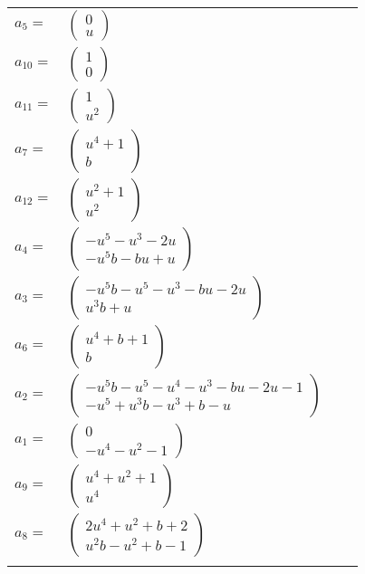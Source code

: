 \documentclass[1p]{elsarticle_modified}
\theoremstyle{definition}
\begin{document}
\begin{tabular}{m{7pt} m{180pt} m{7pt} m{180pt} }
\flushright $a_{5}=$&$\begin{pmatrix}0\\u\end{pmatrix}$ \\
\flushright $a_{10}=$&$\begin{pmatrix}1\\0\end{pmatrix}$ \\
\flushright $a_{11}=$&$\begin{pmatrix}1\\u^2\end{pmatrix}$ \\
\flushright $a_{7}=$&$\begin{pmatrix}u^4+1\\b\end{pmatrix}$ \\
\flushright $a_{12}=$&$\begin{pmatrix}u^2+1\\u^2\end{pmatrix}$ \\
\flushright $a_{4}=$&$\begin{pmatrix}- u^5- u^3-2 u\\- u^5 b- b u+u\end{pmatrix}$ \\
\flushright $a_{3}=$&$\begin{pmatrix}- u^5 b- u^5- u^3- b u-2 u\\u^3 b+u\end{pmatrix}$ \\
\flushright $a_{6}=$&$\begin{pmatrix}u^4+b+1\\b\end{pmatrix}$ \\
\flushright $a_{2}=$&$\begin{pmatrix}- u^5 b- u^5- u^4- u^3- b u-2 u-1\\- u^5+u^3 b- u^3+b- u\end{pmatrix}$ \\
\flushright $a_{1}=$&$\begin{pmatrix}0\\- u^4- u^2-1\end{pmatrix}$ \\
\flushright $a_{9}=$&$\begin{pmatrix}u^4+u^2+1\\u^4\end{pmatrix}$ \\
\flushright $a_{8}=$&$\begin{pmatrix}2 u^4+u^2+b+2\\u^2 b- u^2+b-1\end{pmatrix}$\\&\end{tabular}
\end{document}
